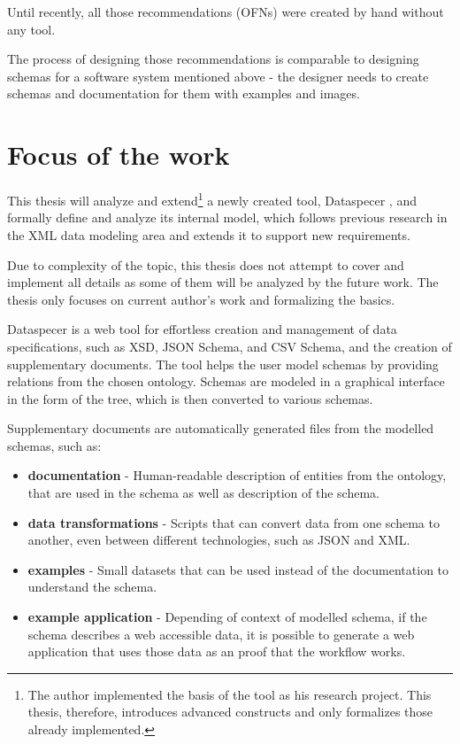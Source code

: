 Until recently, all those recommendations (OFNs) were created by hand without any tool.

\smallskip

The process of designing those recommendations is comparable to designing schemas for a software system mentioned above - the designer needs to create schemas and documentation for them with examples and images.

\section*{Focus of the work}

This thesis will analyze and extend\footnote{The author implemented the basis of the tool as his research project. This thesis, therefore, introduces advanced constructs and only formalizes those already implemented.} a newly created tool, Dataspecer \cite{dataspecer}, and formally define and analyze its internal model, which follows previous research in the XML data modeling area and extends it to support new requirements.

Due to complexity of the topic, this thesis does not attempt to cover and implement all details as some of them will be analyzed by the future work. The thesis only focuses on current author's work and formalizing the basics.

Dataspecer is a web tool for effortless creation and management of data specifications, such as XSD, JSON Schema, and CSV Schema, and the creation of supplementary documents. The tool helps the user model schemas by providing relations from the chosen ontology. Schemas are modeled in a graphical interface in the form of the tree, which is then converted to various schemas.

Supplementary documents are automatically generated files from the modelled schemas, such as:

\begin{itemize}
    \item \textbf{documentation} - Human-readable description of entities from the ontology, that are used in the schema as well as description of the schema.
    \item \textbf{data transformations} - Scripts that can convert data from one schema to another, even between different technologies, such as JSON and XML.
    \item \textbf{examples} - Small datasets that can be used instead of the documentation to understand the schema.
    \item \textbf{example application} - Depending of context of modelled schema, if the schema describes a web accessible data, it is possible to generate a web application that uses those data as an proof that the workflow works.
\end{itemize}

